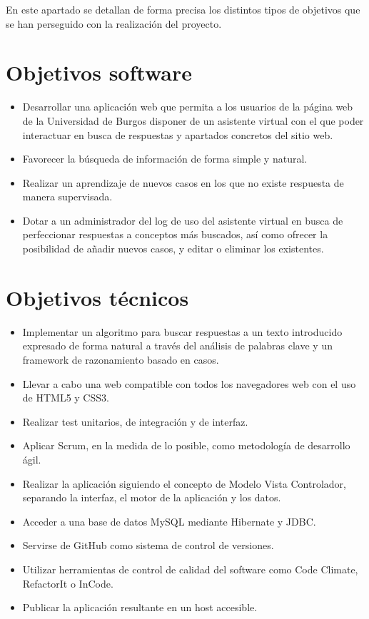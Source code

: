 
En este apartado se detallan de forma precisa los distintos tipos de objetivos que se han perseguido con la realización del proyecto.

\section{Objetivos software}\label{objetivos-software}

\begin{itemize}
\tightlist
\item
  Desarrollar una aplicación web que permita a los usuarios de la página web de la Universidad de Burgos disponer de un asistente virtual con el que poder interactuar en busca de respuestas y apartados concretos del sitio web.
\item
  Favorecer la búsqueda de información de forma simple y natural.
\item
  Realizar un aprendizaje de nuevos casos en los que no existe respuesta de manera supervisada.
\item
   Dotar a un administrador del log de uso del asistente virtual en busca de perfeccionar respuestas a conceptos más buscados, así como ofrecer la posibilidad de añadir nuevos casos, y editar o eliminar los existentes.
\end{itemize}

\section{Objetivos técnicos}\label{objetivos-tecnicos}

\begin{itemize}
\tightlist
\item
Implementar un algoritmo para buscar respuestas a un texto introducido expresado de forma natural a través del análisis de palabras clave y un framework de razonamiento basado en casos.
\item
Llevar a cabo una web compatible con todos los navegadores web con el uso de HTML5 y CSS3.
\item
Realizar test unitarios, de integración y de interfaz.
\item
Aplicar Scrum, en la medida de lo posible, como metodología de desarrollo ágil.
\item
Realizar la aplicación siguiendo el concepto de Modelo Vista Controlador, separando la interfaz, el motor de la aplicación y los datos.
\item
Acceder a una base de datos MySQL mediante Hibernate y JDBC.
\item
Servirse de GitHub como sistema de control de versiones.
\item
Utilizar herramientas de control de calidad del software como Code Climate, RefactorIt o InCode.
\item
Publicar la aplicación resultante en un host accesible.

\end{itemize}


